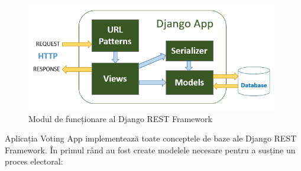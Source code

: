 \begin{figure}[!h]
    \centering
    \includegraphics[width=110mm]{images/rest_flow.png}
    \caption{Modul de funcționare al Django REST Framework}
\end{figure}

Aplicația Voting App implementează toate conceptele de baze ale Django REST Framework. În primul rând au fost create modelele necesare pentru a susține un proces electoral:

